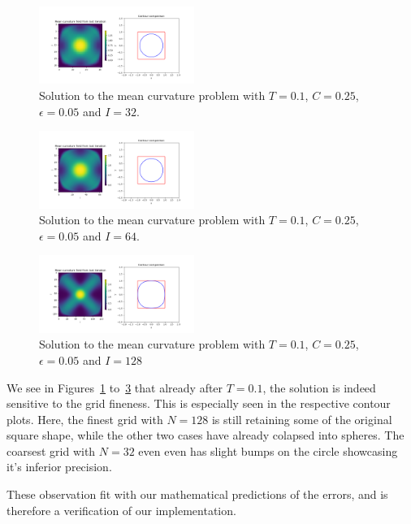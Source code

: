 \documentclass[acmtog]{acmart}
\begin{document}
\begin{figure}[H]
  \centering
  \includegraphics[width=0.45\textwidth]{Images/mean_curvature/exp2_I_32.png}
  \caption{Solution to the mean curvature problem with $T = 0.1$, $C = 0.25$, $\epsilon = 0.05$ and $I = 32$.\label{fig:exp2_I_32}}
\end{figure}
\begin{figure}[H]
  \centering
  \includegraphics[width=0.45\textwidth]{Images/mean_curvature/exp2_I_64.png}
  \caption{Solution to the mean curvature problem with $T = 0.1$, $C = 0.25$, $\epsilon = 0.05$ and $I = 64$.\label{fig:exp2_I_64}}
\end{figure}
\begin{figure}[H]
  \centering
  \includegraphics[width=0.45\textwidth]{Images/mean_curvature/exp2_I_128.png}
  \caption{Solution to the mean curvature problem with $T = 0.1$, $C = 0.25$, $\epsilon = 0.05$ and $I = 128$\label{fig:exp2_I_128}}
\end{figure}

We see in Figures~\ref{fig:exp2_I_32} to~\ref{fig:exp2_I_128} that already
after $T=0.1$, the solution is indeed sensitive to the grid fineness. This is
especially seen in the respective contour plots. Here, the finest grid with
$N=128$ is still retaining some of the original square shape, while the other
two cases have already colapsed into spheres. The coarsest grid with $N = 32$
even even has slight bumps on the circle showcasing it's inferior precision.

These observation fit with our mathematical predictions of the errors, and is
therefore a verification of our implementation.
\end{document}

